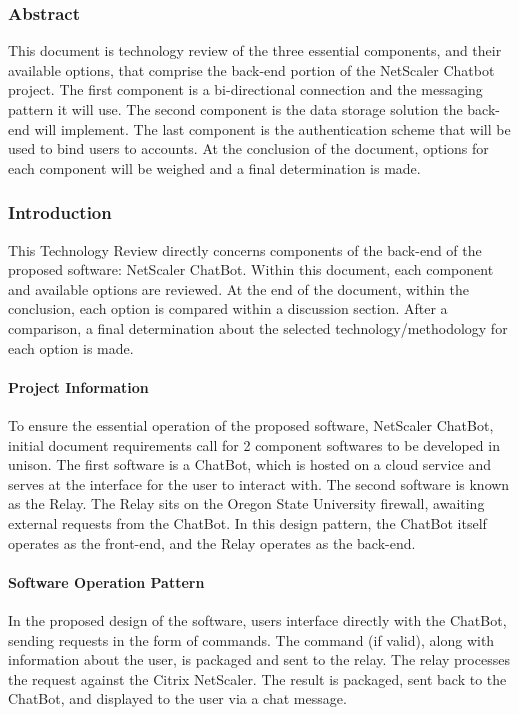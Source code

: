 \subsubsection{Abstract}
This document is technology review of the three essential components, and their available options, that comprise the back-end portion of the NetScaler Chatbot project.
The first component is a bi-directional connection and the messaging pattern it will use.
The second component is the data storage solution the back-end will implement.
The last component is the authentication scheme that will be used to bind users to accounts.
At the conclusion of the document, options for each component will be weighed and a final determination is made.

\subsubsection{Introduction}
This Technology Review directly concerns components of the back-end of the proposed software: NetScaler ChatBot.
Within this document, each component and available options are reviewed.
At the end of the document, within the conclusion, each option is compared within a discussion section.
After a comparison, a final determination about the selected technology/methodology for each option is made.

\paragraph{Project Information}
To ensure the essential operation of the proposed software, NetScaler ChatBot, initial document requirements call for 2 component softwares to be developed in unison.
The first software is a ChatBot, which is hosted on a cloud service and serves at the interface for the user to interact with.
The second software is known as the Relay.
The Relay sits on the Oregon State University firewall, awaiting external requests from the ChatBot. 
In this design pattern, the ChatBot itself operates as the front-end, and the Relay operates as the back-end.

\paragraph{Software Operation Pattern}
In the proposed design of the software, users interface directly with the ChatBot, sending requests in the form of commands.
The command (if valid), along with information about the user, is packaged and sent to the relay.
The relay processes the request against the Citrix NetScaler.
The result is packaged, sent back to the ChatBot, and displayed to the user via a chat message.

